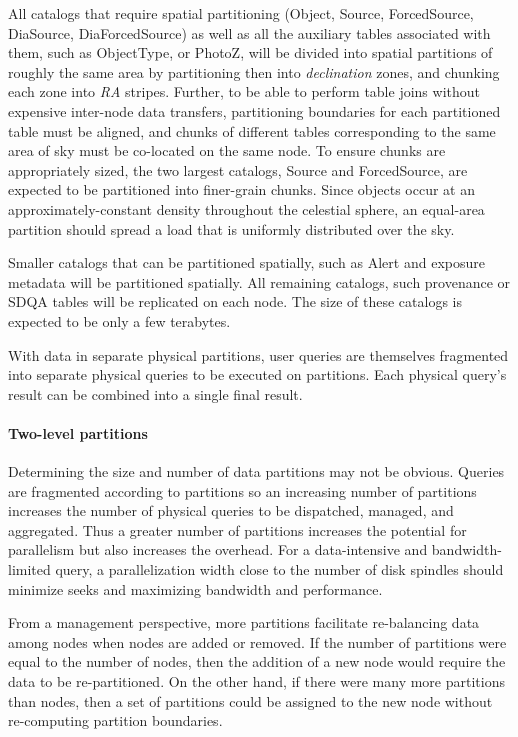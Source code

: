 \documentclass[DM,lsstdraft,toc]{lsstdoc}
\begin{document}
All catalogs that require spatial partitioning (Object, Source,
ForcedSource, DiaSource, DiaForcedSource) as well as all the auxiliary
tables associated with them, such as ObjectType, or PhotoZ, will be
divided into spatial partitions of roughly the same area by partitioning
then into \emph{declination} zones, and chunking each zone into
\emph{RA} stripes. Further, to be able to perform table joins without
expensive inter-node data transfers, partitioning boundaries for each
partitioned table must be aligned, and chunks of different tables
corresponding to the same area of sky must be co-located on the same
node. To ensure chunks are appropriately sized, the two largest
catalogs, Source and ForcedSource, are expected to be partitioned into
finer-grain chunks. Since objects occur at an approximately-constant
density throughout the celestial sphere, an equal-area partition should
spread a load that is uniformly distributed over the sky.

Smaller catalogs that can be partitioned spatially, such as Alert and
exposure metadata will be partitioned spatially. All remaining catalogs,
such provenance or SDQA tables will be replicated on each node. The size
of these catalogs is expected to be only a few terabytes.

With data in separate physical partitions, user queries are themselves
fragmented into separate physical queries to be executed on partitions.
Each physical query's result can be combined into a single final result.

\paragraph{Two-level partitions}\label{two-level-partitions}

Determining the size and number of data partitions may not be obvious.
Queries are fragmented according to partitions so an increasing number
of partitions increases the number of physical queries to be dispatched,
managed, and aggregated. Thus a greater number of partitions increases
the potential for parallelism but also increases the overhead. For a
data-intensive and bandwidth-limited query, a parallelization width
close to the number of disk spindles should minimize seeks and
maximizing bandwidth and performance.

From a management perspective, more partitions facilitate re-balancing
data among nodes when nodes are added or removed. If the number of
partitions were equal to the number of nodes, then the addition of a new
node would require the data to be re-partitioned. On the other hand, if
there were many more partitions than nodes, then a set of partitions
could be assigned to the new node without re-computing partition
boundaries.
\end{document}
